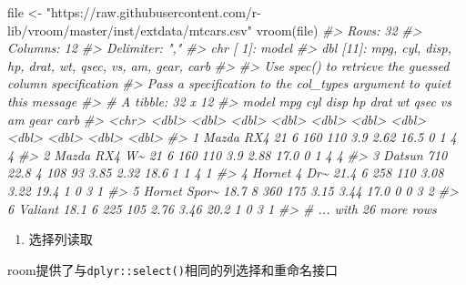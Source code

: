 \documentclass[
]{book}
\newenvironment{Shaded}{\begin{snugshade}}{\end{snugshade}}
\newcommand{\CommentTok}[1]{\textcolor[rgb]{0.56,0.35,0.01}{\textit{#1}}}
\newcommand{\FunctionTok}[1]{\textcolor[rgb]{0.00,0.00,0.00}{#1}}
\newcommand{\NormalTok}[1]{#1}
\newcommand{\OtherTok}[1]{\textcolor[rgb]{0.56,0.35,0.01}{#1}}
\newcommand{\StringTok}[1]{\textcolor[rgb]{0.31,0.60,0.02}{#1}}
\providecommand{\tightlist}{%
  \setlength{\itemsep}{0pt}\setlength{\parskip}{0pt}}
\begin{document}
\begin{Shaded}
\begin{Highlighting}[]
\NormalTok{file }\OtherTok{\textless{}{-}} \StringTok{"https://raw.githubusercontent.com/r{-}lib/vroom/master/inst/extdata/mtcars.csv"}
\FunctionTok{vroom}\NormalTok{(file)}
\CommentTok{\#\textgreater{} Rows: 32}
\CommentTok{\#\textgreater{} Columns: 12}
\CommentTok{\#\textgreater{} Delimiter: ","}
\CommentTok{\#\textgreater{} chr [ 1]: model}
\CommentTok{\#\textgreater{} dbl [11]: mpg, cyl, disp, hp, drat, wt, qsec, vs, am, gear, carb}
\CommentTok{\#\textgreater{} }
\CommentTok{\#\textgreater{} Use \textasciigrave{}spec()\textasciigrave{} to retrieve the guessed column specification}
\CommentTok{\#\textgreater{} Pass a specification to the \textasciigrave{}col\_types\textasciigrave{} argument to quiet this message}
\CommentTok{\#\textgreater{} \# A tibble: 32 x 12}
\CommentTok{\#\textgreater{}   model          mpg   cyl  disp    hp  drat    wt  qsec    vs    am  gear  carb}
\CommentTok{\#\textgreater{}   \textless{}chr\textgreater{}        \textless{}dbl\textgreater{} \textless{}dbl\textgreater{} \textless{}dbl\textgreater{} \textless{}dbl\textgreater{} \textless{}dbl\textgreater{} \textless{}dbl\textgreater{} \textless{}dbl\textgreater{} \textless{}dbl\textgreater{} \textless{}dbl\textgreater{} \textless{}dbl\textgreater{} \textless{}dbl\textgreater{}}
\CommentTok{\#\textgreater{} 1 Mazda RX4     21       6   160   110  3.9   2.62  16.5     0     1     4     4}
\CommentTok{\#\textgreater{} 2 Mazda RX4 W\textasciitilde{}  21       6   160   110  3.9   2.88  17.0     0     1     4     4}
\CommentTok{\#\textgreater{} 3 Datsun 710    22.8     4   108    93  3.85  2.32  18.6     1     1     4     1}
\CommentTok{\#\textgreater{} 4 Hornet 4 Dr\textasciitilde{}  21.4     6   258   110  3.08  3.22  19.4     1     0     3     1}
\CommentTok{\#\textgreater{} 5 Hornet Spor\textasciitilde{}  18.7     8   360   175  3.15  3.44  17.0     0     0     3     2}
\CommentTok{\#\textgreater{} 6 Valiant       18.1     6   225   105  2.76  3.46  20.2     1     0     3     1}
\CommentTok{\#\textgreater{} \# ... with 26 more rows}
\end{Highlighting}
\end{Shaded}

\begin{enumerate}
\def\labelenumi{\arabic{enumi}.}
\setcounter{enumi}{4}
\tightlist
\item
  选择列读取
\end{enumerate}

room提供了与\texttt{dplyr::select()}相同的列选择和重命名接口
\end{document}
